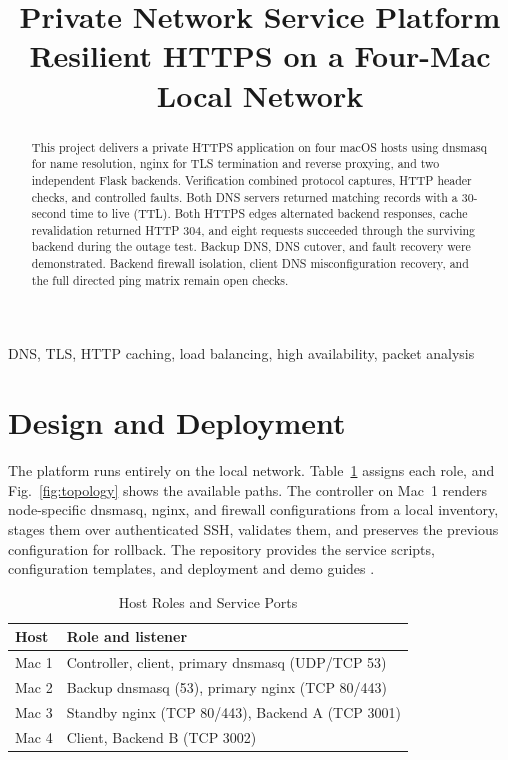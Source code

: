 \documentclass[conference]{IEEEtran}
\begin{document}
\title{Private Network Service Platform\\
Resilient HTTPS on a Four-Mac Local Network}
\author{
}
\maketitle

\begin{abstract}
This project delivers a private HTTPS application on four macOS hosts using
dnsmasq for name resolution, nginx for TLS termination and reverse proxying,
and two independent Flask backends. Verification combined protocol captures,
HTTP header checks, and controlled faults. Both DNS servers returned matching
records with a 30-second time to live (TTL). Both HTTPS edges alternated backend
responses, cache revalidation returned HTTP 304, and eight requests succeeded
through the surviving backend during the outage test. Backup DNS, DNS cutover,
and fault recovery were demonstrated. Backend firewall isolation, client DNS
misconfiguration recovery, and the full directed ping matrix remain open checks.
\end{abstract}

\begin{IEEEkeywords}
DNS, TLS, HTTP caching, load balancing, high availability, packet analysis
\end{IEEEkeywords}

\section{Design and Deployment}

The platform runs entirely on the local network. Table~\ref{tab:roles} assigns
each role, and Fig.~\ref{fig:topology} shows the available paths. The controller
on Mac~1 renders node-specific dnsmasq, nginx, and firewall configurations from a
local inventory, stages them over authenticated SSH, validates them, and
preserves the previous configuration for rollback. The repository provides
the service scripts, configuration templates, and deployment and demo guides
\cite{repo}.

\begin{table}[!b]
\caption{Host Roles and Service Ports}
\label{tab:roles}
\centering
\begin{tabularx}{\columnwidth}{@{}l X@{}}
\toprule
\textbf{Host} & \textbf{Role and listener} \\
\midrule
Mac 1 & Controller, client, primary dnsmasq (UDP/TCP 53) \\
Mac 2 & Backup dnsmasq (53), primary nginx (TCP 80/443) \\
Mac 3 & Standby nginx (TCP 80/443), Backend A (TCP 3001) \\
Mac 4 & Client, Backend B (TCP 3002) \\
\bottomrule
\end{tabularx}
\end{table}
\end{document}
